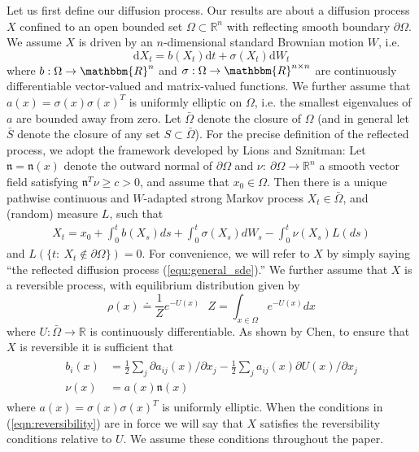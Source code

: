 \documentclass[12pt, nofootinbib,english, amsmath, amssymb, aps, priprint, graphicx,floatfix]{revtex4-1}
\theoremstyle{plain}
\theoremstyle{definition}
\theoremstyle{plain}
\newcommand{\normal}{{\mathfrak{n}}}
\begin{document}
Let us first define our diffusion process.  Our results are about a diffusion process $X$ confined to an open bounded set $\Omega \subset \mathbb{R}^n$ with reflecting smooth boundary $\partial\Omega$.  We assume $X$ is driven by an $n$-dimensional standard Brownian motion $W$, i.e.
\begin{equation}\label{equ:general_sde}\mathrm{d} X_t = b (X_t) \mathrm{d} t + \sigma (X_t) \mathrm{d} W_t \end{equation}
where $b: \Omega \rightarrow \mathbbm{R}^n$ and $\sigma :
\Omega \rightarrow \mathbbm{R}^{n \times n}$ are continuously differentiable vector-valued and matrix-valued functions.  We further assume that $a(x)=\sigma(x)\sigma(x)^T$ is uniformly elliptic on $\Omega$, i.e. the smallest eigenvalues of $a$ are bounded away from zero.  Let $\bar \Omega$ denote the closure of $\Omega$ (and in general let $\bar S$ denote the closure of any set $S\subset \bar \Omega$).  For the precise definition of the reflected process, we adopt the framework developed by Lions and Sznitman\cite{lions1984stochastic}: Let $\normal=\normal(x)$ denote the outward normal of $\partial \Omega$ and $\nu:\ \partial \Omega \rightarrow \mathbb{R}^n$ a smooth vector field satisfying $\normal^T\nu\geq c>0$, and assume that $x_0 \in \Omega$.  Then there is a unique pathwise continuous
and $W$-adapted strong Markov process $X_t\in\bar\Omega$, and (random) measure $L$, such that 
\begin{gather}\label{eq:SDER}
X_t = x_0 + \int_0^t b(X_s)ds + \int_0^t \sigma(X_s)dW_s - \int_0^t \nu(X_s) L(ds)
\end{gather}
and $L(\{t:\ X_t \notin \partial \Omega\})=0$. 
For convenience, we will refer to $X$ by simply saying ``the reflected diffusion process (\ref{equ:general_sde}).'' We further assume that $X$ is a reversible process, with equilibrium distribution given by
\[
\rho(x)\doteq \frac{1}{Z}e^{-U(x)}\ \ \
Z=\int_{x\in\Omega}e^{-U(x)}dx
\]
where $U:\bar \Omega \rightarrow \mathbb{R}$ is continuously differentiable.  As shown by Chen\cite{chen1993reflecting}, to ensure that $X$ is reversible it is sufficient that 
\begin{align}
\begin{split}
b_i(x)&=\frac{1}{2} \sum_j \partial a_{ij}(x)/\partial x_j - \frac{1}{2}\sum_j a_{ij}(x) \partial U(x)/\partial x_j 
\label{eqn:reversibility} \\
\nu(x)&= a(x) \normal(x) 
\end{split}
\end{align}
where $a(x)=\sigma(x)\sigma(x)^T$ is uniformly elliptic.
When the conditions in (\ref{eqn:reversibility}) are in force
we will say that $X$ satisfies the reversibility conditions relative to $U$.  We assume these conditions throughout the paper.
\end{document}
